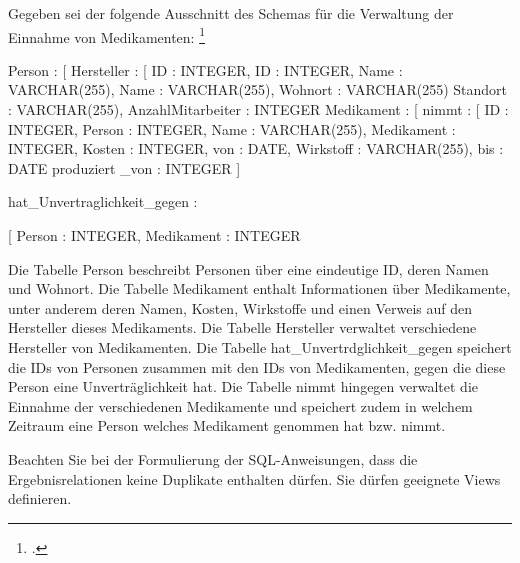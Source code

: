 \documentclass{lehramt-informatik-aufgabe}
\begin{document}

Gegeben sei der folgende Ausschnitt des Schemas für die Verwaltung der
Einnahme von Medikamenten:
\footcite{examen:66116:2019:03}

Person : {[ Hersteller : {[
ID : INTEGER, ID : INTEGER,
Name : VARCHAR(255), Name : VARCHAR(255),
Wohnort : VARCHAR(255) Standort : VARCHAR(255),
} AnzahlMitarbeiter : INTEGER
}
Medikament : {[ nimmt : {[
ID : INTEGER, Person : INTEGER,
Name : VARCHAR(255), Medikament : INTEGER,
Kosten : INTEGER, von : DATE,
Wirkstoff : VARCHAR(255), bis : DATE
produziert \_von : INTEGER ]}
}

hat\_Unvertraglichkeit\_gegen : {[
Person : INTEGER,
Medikament : INTEGER

}

Die Tabelle Person beschreibt Personen über eine eindeutige ID, deren
Namen und Wohnort. Die Tabelle Medikament enthalt Informationen über
Medikamente, unter anderem deren Namen, Kosten, Wirkstoffe und einen
Verweis auf den Hersteller dieses Medikaments. Die Tabelle Hersteller
verwaltet verschiedene Hersteller von Medikamenten. Die Tabelle
hat\_Unvertrdglichkeit\_gegen speichert die IDs von Personen zusammen mit
den IDs von Medikamenten, gegen die diese Person eine Unverträglichkeit
hat. Die Tabelle nimmt hingegen verwaltet die Einnahme der verschiedenen
Medikamente und speichert zudem in welchem Zeitraum eine Person welches
Medikament genommen hat bzw. nimmt.

Beachten Sie bei der Formulierung der SQL-Anweisungen, dass die
Ergebnisrelationen keine Duplikate enthalten dürfen. Sie dürfen
geeignete Views definieren.
\end{document}

